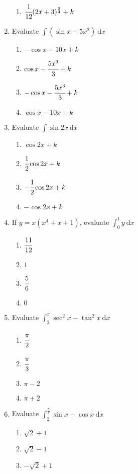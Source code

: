 \begin{multicols}{2}
\begin{enumerate}[label={\arabic*.}]
\begin{enumerate}[label={\Alph*.}]
	\item \(\cfrac{1}{12}(2x+3)^{\frac{3}{4}} + k\)
	\end{enumerate}
\item Evaluate \(\displaystyle \int \left(\sin{x} - 5{x}^{2}\right)\ \mathrm{d}x\)
	\begin{enumerate}[label={\Alph*.}]
	\item \(-\cos{x} - 10x + k\)
	\item \(\cos{x} - \cfrac{5x^3}{3} + k\)
	\item \(-\cos{x} - \cfrac{5x^3}{3} + k\)
	\item \(\cos{x} - 10x + k\)
	\end{enumerate}
\item Evaluate \(\displaystyle \int \sin{2x}\ \mathrm{d}x\)
	\begin{enumerate}[label={\Alph*.}]
	\item \(\cos{2x} + k\)
	\item \(\cfrac{1}{2}\cos{2x} + k\)
	\item \(-\cfrac{1}{2}\cos{2x} + k\)
	\item \(-\cos{2x} + k\)
	\end{enumerate}
\item If \(y = x(x^4 + x + 1)\), evaluate \(\displaystyle \int_{0}^{1} y\ \mathrm{d}x\)
	\begin{enumerate}[label={\Alph*.}]
	\item \(\cfrac{11}{12}\)
	\item \(1\)
	\item \(\cfrac{5}{6}\)
	\item \(0\)
	\end{enumerate}
\item Evaluate \(\displaystyle \int_{2}^{\pi} \sec^{2}{x} - \tan^{2}{x}\ \mathrm{d}x\)
	\begin{enumerate}[label={\Alph*.}]
	\item \(\cfrac{\pi}{2}\)
	\item \(\cfrac{\pi}{3}\)
	\item \(\pi - 2\)
	\item \(\pi + 2\)
	\end{enumerate}
\item Evaluate \(\displaystyle \int_{2}^{\frac{\pi}{4}} \sin{x} - \cos{x}\ \mathrm{d}x\)
	\begin{enumerate}[label={\Alph*.}]
	\item \(\sqrt{2} + 1\)
	\item \(\sqrt{2} - 1\)
	\item \(-\sqrt{2} + 1\)

\end{enumerate}
\end{enumerate}
\end{multicols}
